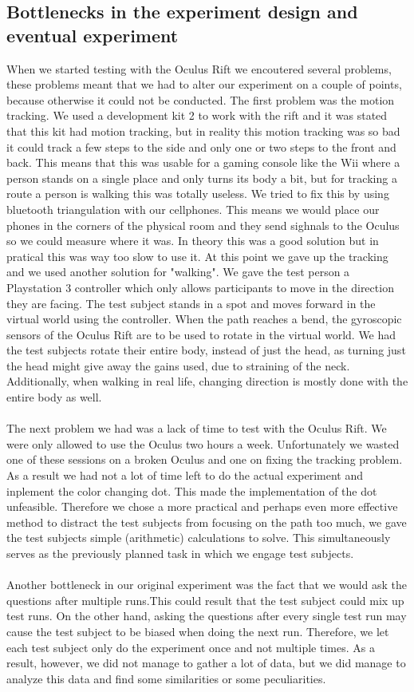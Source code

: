 \subsection{Bottlenecks in the experiment design and eventual experiment}
When we started testing with the Oculus Rift we encoutered several problems, these problems meant that we had to alter our experiment on a couple of points, because otherwise it could not be conducted. The first problem was the motion tracking. We used a development kit 2 to work with the rift and it was stated that this kit had motion tracking, but in reality this motion tracking was so bad it could track a few steps to the side and only one or two steps to the front and back. This means that this was usable for a gaming console like the Wii where a person stands on a single place and only turns its body a bit, but for tracking a route a person is walking this was totally useless. We tried to fix this by using bluetooth triangulation with our cellphones. This means we would place our phones in the corners of the physical room and they send sighnals to the Oculus so we could measure where it was. In theory this was a good solution but in pratical this was way too slow to use it. At this point we gave up the tracking and we used another solution for "walking". We gave the test person a Playstation 3 controller which only allows participants to move in the direction they are facing.
The test subject stands in a spot and moves forward in the virtual world using the controller.
When the path reaches a bend, the gyroscopic sensors of the Oculus Rift are to be used to rotate in the virtual world.
We had the test subjects rotate their entire body, instead of just the head, as turning just the head might give away the gains used, due to straining of the neck.
Additionally, when walking in real life, changing direction is mostly done with the entire body as well.\\
\\
The next problem we had was a lack of time to test with the Oculus Rift. We were only allowed to use the Oculus two hours a week. Unfortunately we wasted one of these sessions on a broken Oculus and one on fixing the tracking problem. As a result we had not a lot of time left to do the actual experiment and inplement the color changing dot. This made the implementation of the dot unfeasible. Therefore we chose a more practical and perhaps even more effective method to distract the test subjects from focusing on the path too much, we gave the test subjects simple (arithmetic) calculations to solve.
This simultaneously serves as the previously planned task in which we engage test subjects.\\
\\
Another bottleneck in our original experiment was the fact that we would ask the questions after multiple runs.This could result that the test subject could mix up test runs. On the other hand, asking the questions after every single test run may cause the test subject to be biased when doing the next run.
Therefore, we let each test subject only do the experiment once and not multiple times.
As a result, however, we did not manage to gather a lot of data, but we did manage to analyze this data and find some similarities or some peculiarities.

